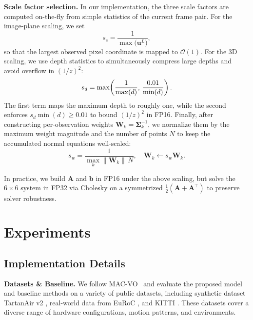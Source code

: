 \textbf{Scale factor selection.}
In our implementation, the three scale factors are computed on-the-fly from simple statistics of the current frame pair.
For the image-plane scaling, we set
\begin{equation}
\label{eq:auto_s_c}
s_c = \frac{1}{\max\bigl(\mathbf{u}^L\bigr)},
\end{equation}
so that the largest observed pixel coordinate is mapped to $\mathcal{O}(1)$.
For the 3D scaling, we use depth statistics to simultaneously compress large depths and avoid overflow in $(1/z)^2$:
\begin{equation}
\small
\label{eq:auto_s_d}
s_d = \max\!\left(\frac{1}{\max(d)},\, \frac{0.01}{\min(d)}\right).
\end{equation}
The first term maps the maximum depth to roughly one, while the second enforces $s_d\min(d)\ge 0.01$ to bound $(1/z)^2$ in FP16.
Finally, after constructing per-observation weights $\mathbf{W}_k=\boldsymbol{\Sigma}_k^{-1}$, we normalize them by the maximum weight magnitude and the number of points $N$ to keep the accumulated normal equations well-scaled:
\begin{equation}
\label{eq:auto_s_w}
s_w = \frac{1}{\max_k \|\mathbf{W}_k\|\, N},\quad \mathbf{W}_k\leftarrow s_w\mathbf{W}_k.
\end{equation}

In practice, we build $\mathbf{A}$ and $\mathbf{b}$ in FP16 under the above scaling, but solve the $6\times 6$ system in FP32 via Cholesky on a symmetrized $\tfrac{1}{2}(\mathbf{A}+\mathbf{A}^\top)$ to preserve solver robustness.


\section{Experiments}
\label{sec:quantmacvo_exp}

\subsection{Implementation Details}
\label{sec:exp_impl}

\textbf{Datasets \& Baseline.}\; We follow MAC-VO~\cite{qiu2025mac} and evaluate the proposed model and baseline methods on a variety of public datasets, including synthetic dataset TartanAir v2 \cite{tartanair}, real-world data from EuRoC \cite{euroc2016}, and KITTI \cite{kitti2012}. These datasets cover a diverse range of hardware configurations, motion patterns, and environments.

